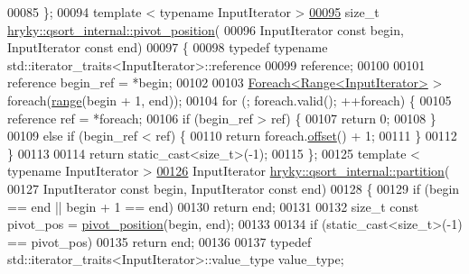 \begin{DoxyCode}
00085 \};
00094 \textcolor{keyword}{template} < \textcolor{keyword}{typename} InputIterator >
\hypertarget{qsort_8h_source_l00095}{}\hyperlink{namespacehryky_1_1qsort__internal_a2a9908c1e249d16e6701c06e341f9e1d}{00095} \textcolor{keywordtype}{size\_t} \hyperlink{namespacehryky_1_1qsort__internal_a2a9908c1e249d16e6701c06e341f9e1d}{hryky::qsort_internal::pivot_position}(
00096     InputIterator \textcolor{keyword}{const} begin, InputIterator \textcolor{keyword}{const} end)
00097 \{
00098     \textcolor{keyword}{typedef} \textcolor{keyword}{typename} std::iterator\_traits<InputIterator>::reference
00099         reference;
00100     
00101     reference begin\_ref = *begin;
00102     
00103     \hyperlink{classhryky_1_1_foreach}{Foreach<Range<InputIterator>} > \textcolor{keywordflow}{foreach}(\hyperlink{namespacehryky_a6093192359bc9630d58d6158bd0178f4}{range}(begin + 1, end));
00104     \textcolor{keywordflow}{for} (; \textcolor{keywordflow}{foreach}.valid(); ++\textcolor{keywordflow}{foreach}) \{
00105         reference ref = *\textcolor{keywordflow}{foreach};
00106         \textcolor{keywordflow}{if} (begin\_ref > ref) \{
00107             \textcolor{keywordflow}{return} 0;
00108         \}
00109         \textcolor{keywordflow}{else} \textcolor{keywordflow}{if} (begin\_ref < ref) \{
00110             \textcolor{keywordflow}{return} \textcolor{keywordflow}{foreach}.\hyperlink{classhryky_1_1_foreach_aab1aceaecb09f71b9ba33ca9ceb49fb1}{offset}() + 1;
00111         \}
00112     \}
00113     
00114     \textcolor{keywordflow}{return} \textcolor{keyword}{static\_cast<}\textcolor{keywordtype}{size\_t}\textcolor{keyword}{>}(-1);
00115 \};
00125 \textcolor{keyword}{template} < \textcolor{keyword}{typename} InputIterator >
\hypertarget{qsort_8h_source_l00126}{}\hyperlink{namespacehryky_1_1qsort__internal_ac2e850d235f7ec38a913c4ea71d2970e}{00126} InputIterator \hyperlink{namespacehryky_1_1qsort__internal_ac2e850d235f7ec38a913c4ea71d2970e}{hryky::qsort_internal::partition}(
00127     InputIterator \textcolor{keyword}{const} begin, InputIterator \textcolor{keyword}{const} end)
00128 \{
00129     \textcolor{keywordflow}{if} (begin == end || begin + 1 == end)
00130         \textcolor{keywordflow}{return} end;
00131 
00132     \textcolor{keywordtype}{size\_t} \textcolor{keyword}{const} pivot\_pos = \hyperlink{namespacehryky_1_1qsort__internal_a2a9908c1e249d16e6701c06e341f9e1d}{pivot_position}(begin, end);
00133 
00134     \textcolor{keywordflow}{if} (static\_cast<size\_t>(-1) == pivot\_pos)
00135         \textcolor{keywordflow}{return} end;
00136 
00137     \textcolor{keyword}{typedef} std::iterator\_traits<InputIterator>::value\_type  value\_type;

\end{DoxyCode}
